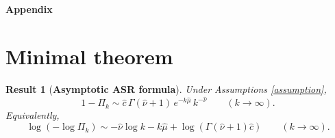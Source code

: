 \documentclass{article}
\newtheorem{theorem}{Result}
\theoremstyle{remark} %
\begin{document}













































































\newpage

\appendix
\begin{center}
\Large{\textbf{Appendix}}
\end{center}

\section{Minimal theorem}\label{minimalTHapp}

\begin{theorem}[\textbf{Asymptotic ASR formula}]
Under Assumptions \ref{assumption},
\begin{equation}
1-\Pi_k\sim \hat{c}\,\Gamma(\hat{\nu}+1)\,e^{-k \hat \mu}\,k^{-\hat{\nu}}
\qquad (k\to\infty). 
\end{equation}
Equivalently, 
\begin{equation}
    \log(-\log \Pi_k)\sim-\hat{\nu}\log k-k\hat \mu+ \log (\Gamma(\hat{\nu}+1) \hat{c})
\qquad (k\to\infty). 
\end{equation}
\end{theorem}
\end{document}
